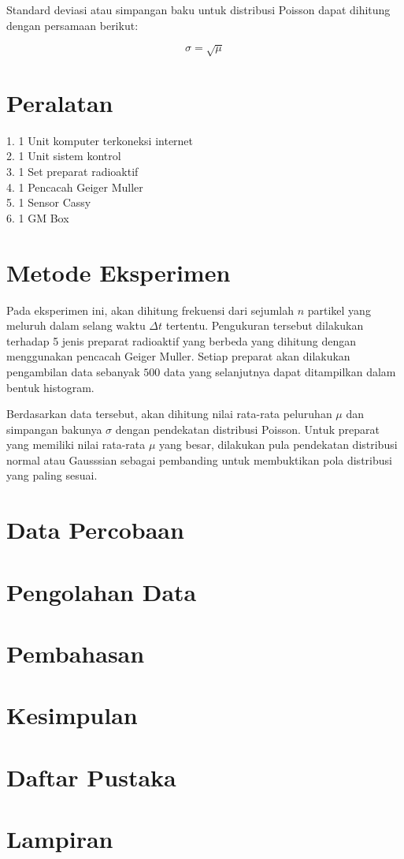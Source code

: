 \documentclass{article}
\begin{document}
		\par Standard deviasi atau simpangan baku untuk distribusi Poisson dapat dihitung dengan persamaan berikut: 
		
		\begin{equation}
			\sigma = \sqrt{\mu}
		\end{equation}
		
	\section{Peralatan}
	1. 1 Unit komputer terkoneksi internet \\
	2. 1 Unit sistem kontrol \\ 
	3. 1 Set preparat radioaktif \\
	4. 1 Pencacah Geiger Muller \\
	5. 1 Sensor Cassy \\
	6. 1 GM Box \\
	
	\section{Metode Eksperimen}
	
		\hspace{0.35 cm} Pada eksperimen ini, akan dihitung frekuensi dari sejumlah $n$ partikel yang meluruh dalam selang waktu $\Delta t$ tertentu. Pengukuran tersebut dilakukan terhadap 5 jenis preparat radioaktif yang berbeda yang dihitung dengan menggunakan pencacah Geiger Muller. Setiap preparat akan dilakukan pengambilan data sebanyak $500$ data yang selanjutnya dapat ditampilkan dalam bentuk histogram. 
		
		\par Berdasarkan data tersebut, akan dihitung nilai rata-rata peluruhan $\mu$ dan simpangan bakunya $\sigma$ dengan pendekatan distribusi Poisson. Untuk preparat yang memiliki nilai rata-rata $\mu$ yang besar, dilakukan pula pendekatan distribusi normal atau Gausssian sebagai pembanding untuk membuktikan pola distribusi yang paling sesuai. 
	
	\section{Data Percobaan}
	
	\section{Pengolahan Data}
	
	\section{Pembahasan}
	
	\section{Kesimpulan}
	
	\section{Daftar Pustaka}
	
	\section{Lampiran}
	
\end{document}
